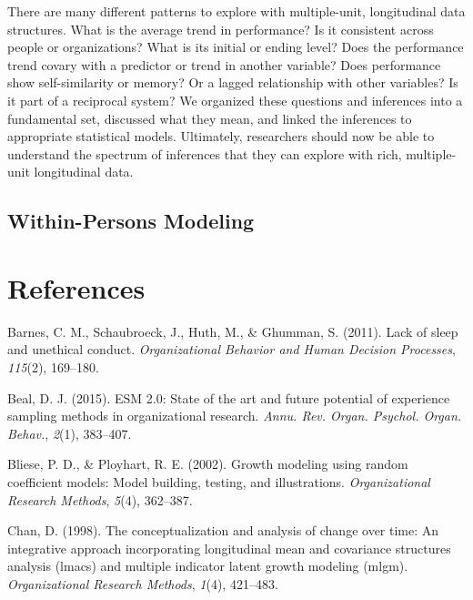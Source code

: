 \documentclass[english,,man]{apa6}
\theoremstyle{definition}
\theoremstyle{definition}
\theoremstyle{definition}
\theoremstyle{remark}
\begin{document}
There are many different patterns to explore with multiple-unit,
longitudinal data structures. What is the average trend in performance?
Is it consistent across people or organizations? What is its initial or
ending level? Does the performance trend covary with a predictor or
trend in another variable? Does performance show self-similarity or
memory? Or a lagged relationship with other variables? Is it part of a
reciprocal system? We organized these questions and inferences into a
fundamental set, discussed what they mean, and linked the inferences to
appropriate statistical models. Ultimately, researchers should now be
able to understand the spectrum of inferences that they can explore with
rich, multiple-unit longitudinal data.

\hypertarget{within-persons-modeling}{%
\subsection{Within-Persons Modeling}\label{within-persons-modeling}}

\newpage

\hypertarget{references}{%
\section{References}\label{references}}

\setlength{\parindent}{-0.5in}
\setlength{\leftskip}{0.5in}

\hypertarget{refs}{}
\leavevmode\hypertarget{ref-barnes_lack_2011}{}%
Barnes, C. M., Schaubroeck, J., Huth, M., \& Ghumman, S. (2011). Lack of
sleep and unethical conduct. \emph{Organizational Behavior and Human
Decision Processes}, \emph{115}(2), 169--180.

\leavevmode\hypertarget{ref-beal_esm_2015}{}%
Beal, D. J. (2015). ESM 2.0: State of the art and future potential of
experience sampling methods in organizational research. \emph{Annu. Rev.
Organ. Psychol. Organ. Behav.}, \emph{2}(1), 383--407.

\leavevmode\hypertarget{ref-bliese_growth_2002}{}%
Bliese, P. D., \& Ployhart, R. E. (2002). Growth modeling using random
coefficient models: Model building, testing, and illustrations.
\emph{Organizational Research Methods}, \emph{5}(4), 362--387.

\leavevmode\hypertarget{ref-chan1998conceptualization}{}%
Chan, D. (1998). The conceptualization and analysis of change over time:
An integrative approach incorporating longitudinal mean and covariance
structures analysis (lmacs) and multiple indicator latent growth
modeling (mlgm). \emph{Organizational Research Methods}, \emph{1}(4),
421--483.
\end{document}
